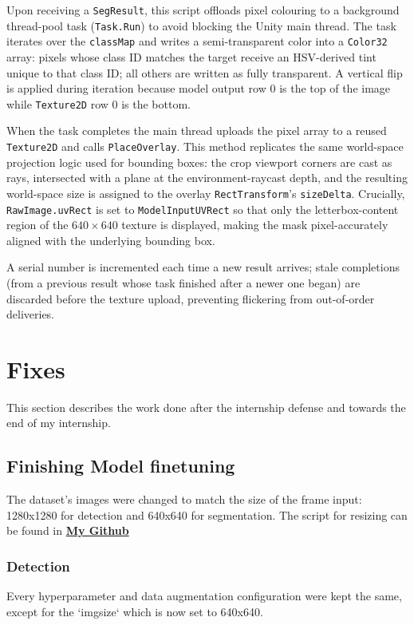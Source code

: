 \documentclass{article}
\begin{document}
Upon receiving a \texttt{SegResult}, this script offloads pixel colouring to a background thread-pool task (\texttt{Task.Run}) to avoid blocking the Unity main thread. The task iterates over the \texttt{classMap} and writes a semi-transparent color into a \texttt{Color32} array: pixels whose class ID matches the target receive an HSV-derived tint unique to that class ID; all others are written as fully transparent. A vertical flip is applied during iteration because model output row 0 is the top of the image while \texttt{Texture2D} row 0 is the bottom.

When the task completes the main thread uploads the pixel array to a reused \texttt{Texture2D} and calls \texttt{PlaceOverlay}. This method replicates the same world-space projection logic used for bounding boxes: the crop viewport corners are cast as rays, intersected with a plane at the environment-raycast depth, and the resulting world-space size is assigned to the overlay \texttt{RectTransform}'s \texttt{sizeDelta}. Crucially, \texttt{RawImage.uvRect} is set to \texttt{ModelInputUVRect} so that only the letterbox-content region of the $640 \times 640$ texture is displayed, making the mask pixel-accurately aligned with the underlying bounding box.

A serial number is incremented each time a new result arrives; stale completions (from a previous result whose task finished after a newer one began) are discarded before the texture upload, preventing flickering from out-of-order deliveries.

\section{Fixes}
This section describes the work done after the internship defense and towards the end of my internship.

\subsection{Finishing Model finetuning}
The dataset's images were changed to match the size of the frame input: 1280x1280 for detection and 640x640 for segmentation. The script for resizing can be found in \href{https://github.com/NguyenHoangNhat-git/Segmentation-and-Multi-Detection-YOLO-for-Meta-Quest-3}{\textbf{My Github}}

\subsubsection{Detection}
Every hyperparameter and data augmentation configuration were kept the same, except for the `imgsize` which is now set to 640x640.
\end{document}

